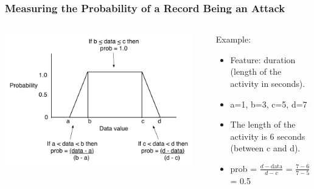 \documentclass{beamer}
\newcommand{\linespace}{\vskip 0.25cm}
\begin{document}
\begin{frame}
  \frametitle{Measuring the Probability of a Record Being an Attack}

  \begin{columns}
  \begin{column}{0.6\textwidth}
  \includegraphics[width=0.95\textwidth]{../TrapezoidFigure.pdf}
  \end{column}

  \begin{column}{0.4\textwidth}
  Example:
  \begin{itemize}
  	\item Feature: duration (length of the activity in seconds).
  	\item a=1, b=3, c=5, d=7
  	\item The length of the activity is 6 seconds (between c and d).
  	\linespace
  	\item prob = $\frac{d-\textrm{data}}{d-c}$ = $\frac{7-6}{7-5}$ = 0.5
  \end{itemize}

  \end{column}
  \end{columns}
\end{frame}
\end{document}
